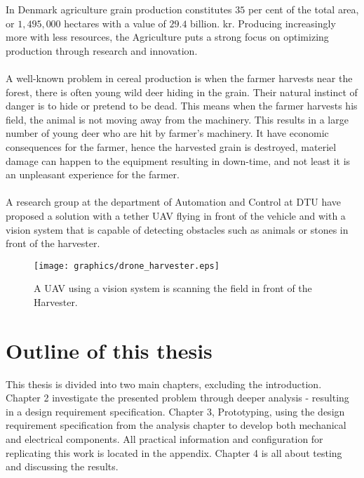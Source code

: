 In Denmark agriculture grain production constitutes $35$ per cent of the total area, or $1,495,000$ hectares with a value of $29.4$ billion. kr. Producing increasingly more with less resources, the Agriculture puts a strong focus on optimizing production through research and innovation\cite{FødevarerLandbrug2013}.
\\
\\
A well-known problem in cereal production is when the farmer harvests near the forest, there is often young wild deer hiding in the grain. Their natural instinct of danger is to hide or pretend to be dead. This means when the farmer harvests his field, the animal is not moving away from the machinery. This results in a large number of young deer who are hit by farmer’s machinery. It have economic consequences for the farmer, hence the harvested grain is destroyed, materiel damage can happen to the equipment resulting in down-time, and not least it is an unpleasant experience for the farmer.
\\
\\
A research group at the department of Automation and Control at DTU have proposed a solution with a tether UAV flying in front of the vehicle and with a vision system that is capable of detecting obstacles such as animals or stones in front of the harvester.

\begin{figure}[hbtp]
\centering
\texttt{[image: graphics/drone\_harvester.eps]}
\caption{A UAV using a vision system is scanning the field in front of the Harvester.}
\end{figure}


\section{Outline of this thesis}
This thesis is divided into two main chapters, excluding the introduction. Chapter 2 investigate the presented problem through deeper analysis - resulting in a design requirement specification. Chapter 3, Prototyping, using the design requirement specification from the analysis chapter to develop both mechanical and electrical components. All practical information and configuration for replicating this work is located in the appendix. Chapter 4 is all about testing and discussing the results.



